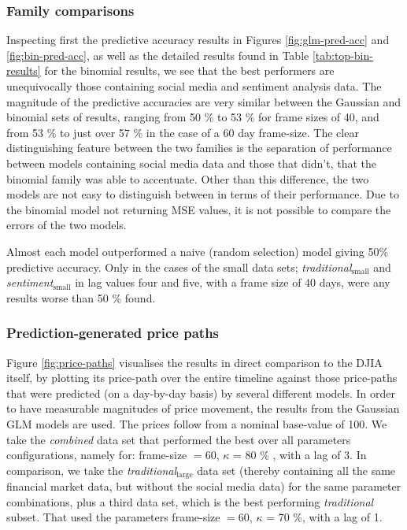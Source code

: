 \documentclass{article}
\begin{document}
\begin{table}
\end{table}

\pagebreak


\subsubsection{Family comparisons}
\label{sec-6-4-4}

Inspecting first the predictive accuracy results in Figures \ref{fig:glm-pred-acc} and \ref{fig:bin-pred-acc}, as well as the detailed results found in Table \ref{tab:top-bin-results} for the binomial results, we see that the best performers are unequivocally those containing social media and sentiment analysis data. The magnitude of the predictive accuracies are very similar between the Gaussian and binomial sets of results, ranging from 50 \% to 53 \% for frame sizes of 40, and from 53 \% to just over 57 \% in the case of a 60 day frame-size. The clear distinguishing feature between the two families is the separation of performance between models containing social media data and those that didn't, that the binomial family was able to accentuate. Other than this difference, the two models are not easy to distinguish between in terms of their performance. Due to the binomial model not returning MSE values, it is not possible to compare the errors of the two models.

Almost each model outperformed a naive (random selection) model giving 50\% predictive accuracy. Only in the cases of the small data sets; \emph{traditional$_{\text{small}}$} and \emph{sentiment$_{\text{small}}$} in lag values four and five, with a frame size of 40 days, were any results worse than 50 \% found.


\subsubsection{Prediction-generated price paths \label{price-paths}}
\label{sec-6-4-5}

Figure \ref{fig:price-paths} visualises the results in direct comparison to the DJIA itself, by plotting its price-path over the entire timeline against those price-paths that were predicted (on a day-by-day basis) by several different models. In order to have measurable magnitudes of price movement, the results from the Gaussian GLM models are used. The prices follow from a nominal base-value of 100. We take the \emph{combined} data set that performed the best over all parameters configurations, namely for: frame-size $= 60$, $\kappa$ = 80 \% , with a lag of 3. In comparison, we take the \emph{traditional$_{\text{large}}$} data set (thereby containing all the same financial market data, but without the social media data) for the same parameter combinations, plus a third data set, which is the best performing \emph{traditional} subset. That used the parameters frame-size $= 60$, $\kappa$ = 70 \%, with a lag of 1.
\end{document}
